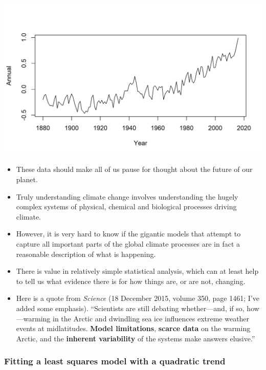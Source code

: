 \documentclass[]{article}
\begin{document}
\begin{center}\includegraphics{figure/intro-data_plot-1} \end{center}

\begin{itemize}
\item
  These data should make all of us pause for thought about the future of
  our planet.
\item
  Truly understanding climate change involves understanding the hugely
  complex systems of physical, chemical and biological processes driving
  climate.
\item
  However, it is very hard to know if the gigantic models that attempt
  to capture all important parts of the global climate processes are in
  fact a reasonable description of what is happening.
\item
  There is value in relatively simple statistical analysis, which can at
  least help to tell us what evidence there is for how things are, or
  are not, changing.
\item
  Here is a quote from \emph{Science} (18 December 2015, volume 350,
  page 1461; I've added some emphasis). ``Scientists are still debating
  whether---and, if so, how---warming in the Arctic and dwindling sea
  ice influences extreme weather events at midlatitudes. \textbf{Model
  limitations}, \textbf{scarce data} on the warming Arctic, and the
  \textbf{inherent variability} of the systems make answers elusive.''
\end{itemize}

\subsubsection{Fitting a least squares model with a quadratic
trend}\label{fitting-a-least-squares-model-with-a-quadratic-trend}
\end{document}

